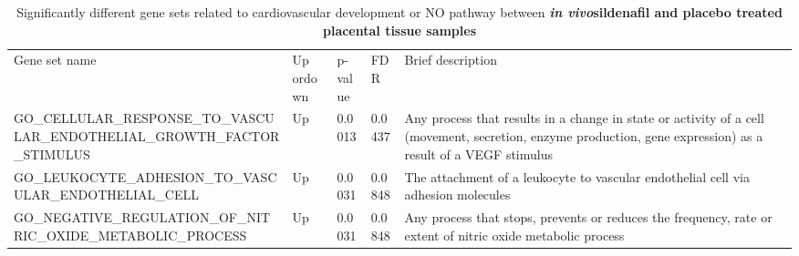 \documentclass[authordate, empirical,issue]{jote-new-article}
\begin{document}
\begin{table}[h!]
  \begin{fullwidth}
    \caption{Significantly different gene sets related to cardiovascular development or NO pathway between \emph{\textbf{in vivo}}\textbf{sildenafil and placebo treated placental tissue samples}}

    \begin{tabularx}{\linewidth}{@{} X l l l X @{}}
      Gene set name                                                               & Up ordown                                                                                                   & p-value                                                                                                                                                      & FDR    & Brief description                                                                                                              \\

      GO\_CELLULAR\_RESPONSE\_TO\_VASCULAR\_ENDOTHELIAL\_GROWTH\_FACTOR\_STIMULUS & Up                                                                                                          &
      0.0013                                                                      & 0.0437                                                                                                      & Any process that results in a change in state or activity of a cell (movement, secretion, enzyme production, gene expression) as a result of a VEGF stimulus
      \\

      GO\_LEUKOCYTE\_ADHESION\_TO\_VASCULAR\_ENDOTHELIAL\_CELL                    & Up                                                                                                          & 0.0031                                                                                                                                                       & 0.0848
                                                                                  & The attachment of a leukocyte to vascular endothelial cell via adhesion molecules
      \\

      GO\_NEGATIVE\_REGULATION\_OF\_NITRIC\_OXIDE\_METABOLIC\_PROCESS             & Up                                                                                                          & 0.0031                                                                                                                                                       & 0.0848
                                                                                  & Any process that stops, prevents or reduces the frequency, rate or extent of nitric oxide metabolic process
      \\


\end{tabularx}
\end{fullwidth}
\end{table}
\end{document}
